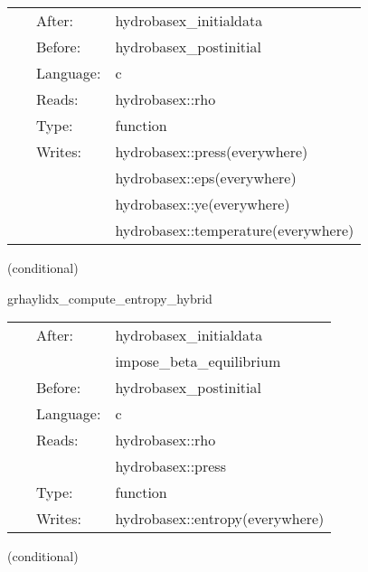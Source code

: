 \documentclass{article}
\begin{document}
\hspace{5mm}{\it set y\_e, temperature, entropy, press, eps in neutrino free beta-equilibrium } 


\hspace{5mm}

 \begin{tabular*}{160mm}{cll} 
~ & After:  & hydrobasex\_initialdata \\ 
~ & Before:  & hydrobasex\_postinitial \\ 
~ & Language:  & c \\ 
~ & Reads:  & hydrobasex::rho \\ 
~ & Type:  & function \\ 
~ & Writes:  & hydrobasex::press(everywhere) \\ 
~& ~ &hydrobasex::eps(everywhere)\\ 
~& ~ &hydrobasex::ye(everywhere)\\ 
~& ~ &hydrobasex::temperature(everywhere)\\ 
\end{tabular*} 


\vspace{5mm}

\noindent {\bf }   (conditional) 

\hspace{5mm} grhaylidx\_compute\_entropy\_hybrid 

\hspace{5mm}{\it computes entropy from density and pressure using hybrid eos } 


\hspace{5mm}

 \begin{tabular*}{160mm}{cll} 
~ & After:  & hydrobasex\_initialdata \\ 
~& ~ &impose\_beta\_equilibrium\\ 
~ & Before:  & hydrobasex\_postinitial \\ 
~ & Language:  & c \\ 
~ & Reads:  & hydrobasex::rho \\ 
~& ~ &hydrobasex::press\\ 
~ & Type:  & function \\ 
~ & Writes:  & hydrobasex::entropy(everywhere) \\ 
\end{tabular*} 


\vspace{5mm}

\noindent {\bf }   (conditional) 
\end{document}
